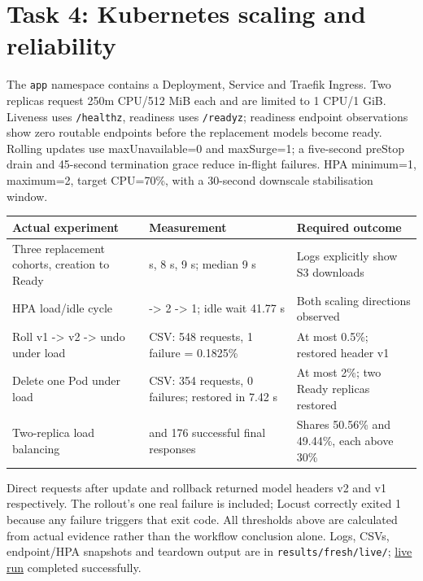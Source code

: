 \documentclass[10pt,a4paper]{article}
\begin{document}
\section{Task 4: Kubernetes scaling and reliability}

The \texttt{app} namespace contains a Deployment, Service and Traefik Ingress. Two replicas request 250m CPU/512 MiB each and are limited to 1 CPU/1 GiB. Liveness uses \texttt{/\allowbreak{}healthz}, readiness uses \texttt{/\allowbreak{}readyz}; readiness endpoint observations show zero routable endpoints before the replacement models become ready. Rolling updates use maxUnavailable=0 and maxSurge=1; a five-second preStop drain and 45-second termination grace reduce in-flight failures. HPA minimum=1, maximum=2, target CPU=70\%, with a 30-second downscale stabilisation window.


\begin{center}\small\begin{tabularx}{\linewidth}{@{}>{\raggedright\arraybackslash}X>{\raggedright\arraybackslash}X>{\raggedright\arraybackslash}X@{}}\toprule

\textbf{Actual experiment} & \textbf{Measurement} & \textbf{Required outcome} \\ \midrule

Three replacement cohorts, creation to Ready & 9 s, 8 s, 9 s; median 9 s & Logs explicitly show S3 downloads \\

HPA load/idle cycle & 1 -\textgreater{} 2 -\textgreater{} 1; idle wait 41.77 s & Both scaling directions observed \\

Roll v1 -\textgreater{} v2 -\textgreater{} undo under load & CSV: 548 requests, 1 failure = 0.1825\% & At most 0.5\%; restored header v1 \\

Delete one Pod under load & CSV: 354 requests, 0 failures; restored in 7.42 s & At most 2\%; two Ready replicas restored \\

Two-replica load balancing & 180 and 176 successful final responses & Shares 50.56\% and 49.44\%, each above 30\% \\

\bottomrule\end{tabularx}\end{center}

Direct requests after update and rollback returned model headers v2 and v1 respectively. The rollout's one real failure is included; Locust correctly exited 1 because any failure triggers that exit code. All thresholds above are calculated from actual evidence rather than the workflow conclusion alone. Logs, CSVs, endpoint/HPA snapshots and teardown output are in \texttt{results/\allowbreak{}fresh/\allowbreak{}live/\allowbreak{}}; \href{https://github.com/lokesh1-cell/cloud-assignmnet/actions/runs/42493789838}{live run} completed successfully.
\end{document}
